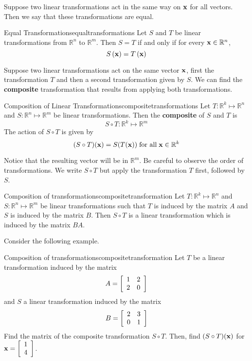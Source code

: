 Suppose two linear transformations act in the same way on ${\bf x}$ for all vectors. Then we say that these transformations are equal.

\begin{definition}{Equal Transformations}{equaltransformations}
Let $S$ and $T$ be linear transformations from $\mathbb{R}^n$ to $\mathbb{R}^m$. Then $S = T$ if and only if for every ${\bf x} \in \mathbb{R}^n$, 
\[
S \left( {\bf x} \right) = T \left( {\bf x} \right)
\]
\end{definition}

Suppose two linear transformations act on the same vector ${\bf x}$, first the transformation $T$ and then a second transformation given by $S$. We can find the \textbf{composite} transformation that results from applying both transformations.

\begin{definition}{Composition of Linear Transformations}{compositetransformations}
Let $T: \mathbb{R}^k \mapsto \mathbb{R}^n$ and $S: \mathbb{R}^n \mapsto \mathbb{R}^m$ be linear transformations. Then the \textbf{composite} of $S$ and $T$ is 
\[
S \circ T: \mathbb{R}^k \mapsto \mathbb{R}^m
\]
The action of $S \circ T$ is given by 
\[
(S \circ T) ({\bf x}) = S(T({\bf x})) \; \mbox{for all} \; {\bf x} \in \mathbb{R}^k
\]
\end{definition}

Notice that the resulting vector will be in $\mathbb{R}^m$. Be careful to observe the order of transformations. We write $S \circ T$ but apply the transformation $T$ first, followed by $S$. 

\begin{theorem}{Composition of transformations}{compositetransformation}
Let $T: \mathbb{R}^k \mapsto \mathbb{R}^n$ and $S: \mathbb{R}^n \mapsto \mathbb{R}^m$ be linear transformations such that $T$ is induced by the matrix $A$ and $S$ is induced by the matrix $B$. Then $S \circ T$ is a linear transformation which is induced by the matrix $BA$.
\end{theorem}

Consider the following example. 

\begin{example}{Composition of transformations}{compositetransformation}
Let $T$ be a linear transformation induced by the matrix 
\[
A = 
\left[
\begin{array}{rr}
1 & 2 \\
2 & 0 
\end{array}
\right]
\]
and $S$ a linear transformation induced by the matrix
\[
B = 
\left[
\begin{array}{rr}
2 & 3 \\
0 & 1
\end{array}
\right]
\]
Find the matrix of the composite transformation $S \circ T$. Then, find $(S \circ T)({\bf x})$ for ${\bf x} = \left[
\begin{array}{r}
1 \\
4 
\end{array}
\right]$.
\end{example}

